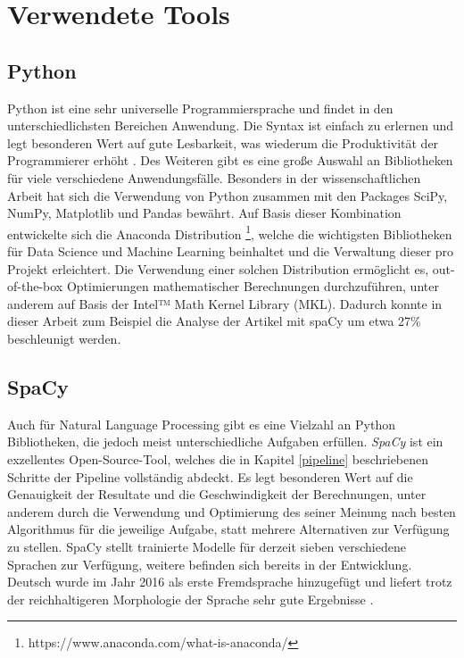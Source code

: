 \section{Verwendete Tools}

\subsection{Python}\label{python}
Python ist eine sehr universelle Programmiersprache und findet in den unterschiedlichsten Bereichen Anwendung. Die Syntax ist einfach zu erlernen und legt besonderen Wert auf gute Lesbarkeit, was wiederum die Produktivität der Programmierer erhöht \cite{pythonSummary}. Des Weiteren gibt es eine große Auswahl an Bibliotheken für viele verschiedene Anwendungsfälle. Besonders in der wissenschaftlichen Arbeit hat sich die Verwendung von Python zusammen mit den Packages SciPy, NumPy, Matplotlib und Pandas bewährt. Auf Basis dieser Kombination entwickelte sich die Anaconda Distribution \footnote{https://www.anaconda.com/what-is-anaconda/}, welche die wichtigsten Bibliotheken für Data Science und Machine Learning beinhaltet und die Verwaltung dieser pro Projekt erleichtert. Die Verwendung einer solchen Distribution ermöglicht es, out-of-the-box Optimierungen mathematischer Berechnungen durchzuführen, unter anderem auf Basis der Intel™ Math Kernel Library (MKL). Dadurch konnte in dieser Arbeit zum Beispiel die Analyse der Artikel mit spaCy um etwa 27\% beschleunigt werden.

\subsection{SpaCy}
Auch für Natural Language Processing gibt es eine Vielzahl an Python Bibliotheken, die jedoch meist unterschiedliche Aufgaben erfüllen. \emph{SpaCy} ist ein exzellentes Open-Source-Tool, welches die in Kapitel \ref{pipeline} beschriebenen Schritte der Pipeline vollständig abdeckt. Es legt besonderen Wert auf die Genauigkeit der Resultate und die Geschwindigkeit der Berechnungen, unter anderem durch die Verwendung und Optimierung des seiner Meinung nach besten Algorithmus für die jeweilige Aufgabe, statt mehrere Alternativen zur Verfügung zu stellen. SpaCy stellt trainierte Modelle für derzeit sieben verschiedene Sprachen zur Verfügung, weitere befinden sich bereits in der Entwicklung. Deutsch wurde im Jahr 2016 als erste Fremdsprache hinzugefügt und liefert trotz der reichhaltigeren Morphologie der Sprache sehr gute Ergebnisse \cite{spacyGerman}.

